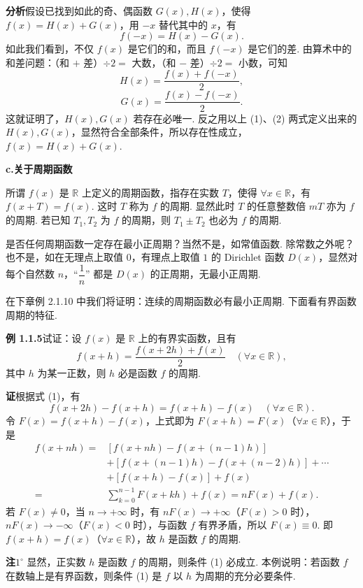 \documentclass[UTF8, 12pt, fontset=fandol, oneside]{ctexart}
\begin{document}
\noindent\textbf{分析}\quad 假设已找到如此的奇、偶函数 $G(x),H(x)$，使得 $f(x)=H(x)+G(x)$，用 $-x$ 替代其中的 $x$，有
\[
  f(-x)=H(x)-G(x).
\]
如此我们看到，不仅 $f(x)$ 是它们的和，而且 $f(-x)$ 是它们的差. 由算术中的和差问题：（和 $+$ 差）$\div 2=$ 大数，（和 $-$ 差）$\div 2=$ 小数，可知
\[
  H(x)=\frac{f(x)+f(-x)}2,
\tag{1}
\]
\[
  G(x)=\frac{f(x)-f(-x)}2.
\tag{2}
\]
这就证明了，$H(x),G(x)$ 若存在必唯一. 反之用以上 (1)、(2) 两式定义出来的 $H(x),G(x)$，显然符合全部条件，所以存在性成立，$f(x)=H(x)+G(x)$.

\noindent\textbf{c.\quad 关于周期函数}

所谓 $f(x)$ 是 $\mathbb{R}$ 上定义的周期函数，指存在实数 $T$，使得 $\forall x\in\mathbb{R}$，有 $f(x+T)=f(x)$. 这时 $T$ 称为 $f$ 的周期. 显然此时 $T$ 的任意整数倍 $mT$ 亦为 $f$ 的周期. 若已知 $T_1,T_2$ 为 $f$ 的周期，则 $T_1\pm T_2$ 也必为 $f$ 的周期.

是否任何周期函数一定存在最小正周期？当然不是，如常值函数. 除常数之外呢？也不是，如在无理点上取值 $0$，有理点上取值 $1$ 的 Dirichlet 函数 $D(x)$，显然对每个自然数 $n$，“$\dfrac1n$” 都是 $D(x)$ 的正周期，无最小正周期.

在下章例 2.1.10 中我们将证明：连续的周期函数必有最小正周期. 下面看有界函数周期的特征.

\noindent\textbf{例 1.1.5}\quad 试证：设 $f(x)$ 是 $\mathbb{R}$ 上的有界实函数，且有
\[
  f(x+h)=\frac{f(x+2h)+f(x)}2\quad(\forall x\in\mathbb{R}),
\tag{1}
\]
其中 $h$ 为某一正数，则 $h$ 必是函数 $f$ 的周期.

\noindent\textbf{证}\quad 根据式 (1)，有
\[
  f(x+2h)-f(x+h)=f(x+h)-f(x)\quad(\forall x\in\mathbb{R}).
\]
令 $F(x)=f(x+h)-f(x)$，上式即为 $F(x+h)=F(x)$（$\forall x\in\mathbb{R}$），于是
\[
\begin{aligned}
f(x+nh)
={}&[f(x+nh)-f(x+(n-1)h)]\\
&+[f(x+(n-1)h)-f(x+(n-2)h)]+\cdots\\
&+[f(x+h)-f(x)]+f(x)\\
={}&\sum_{k=0}^{n-1}F(x+kh)+f(x)=nF(x)+f(x).
\end{aligned}
\]
若 $F(x)\ne0$，当 $n\to+\infty$ 时，有 $nF(x)\to+\infty$（$F(x)>0$ 时），$nF(x)\to-\infty$（$F(x)<0$ 时），与函数 $f$ 有界矛盾，所以 $F(x)\equiv0$. 即 $f(x+h)=f(x)$（$\forall x\in\mathbb{R}$），故 $h$ 是函数 $f$ 的周期.

\noindent\textbf{注}\quad $1^\circ$ 显然，正实数 $h$ 是函数 $f$ 的周期，则条件 (1) 必成立. 本例说明：若函数 $f$ 在数轴上是有界函数，则条件 (1) 是 $f$ 以 $h$ 为周期的充分必要条件.
\end{document}
